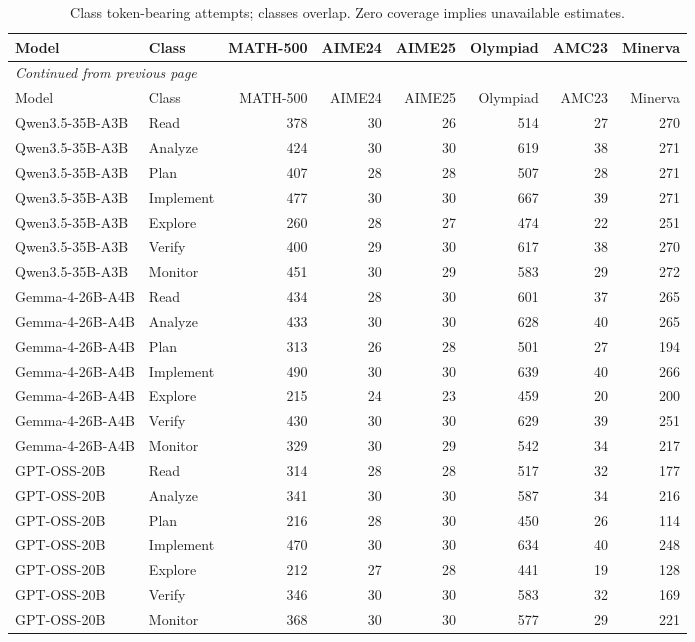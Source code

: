 \begingroup\scriptsize\setlength{\tabcolsep}{4pt}
\begin{longtable}{@{}llrrrrrr@{}}
\caption{Class token-bearing attempts; classes overlap. Zero coverage implies unavailable estimates.}\label{tab:multi-coverage}\\
\toprule
Model & Class & MATH-500 & AIME24 & AIME25 & Olympiad & AMC23 & Minerva \\
\midrule\endfirsthead
\multicolumn{8}{l}{\textit{Continued from previous page}}\\
\toprule
Model & Class & MATH-500 & AIME24 & AIME25 & Olympiad & AMC23 & Minerva \\
\midrule\endhead
\bottomrule\endfoot
Qwen3.5-35B-A3B & Read & 378 & 30 & 26 & 514 & 27 & 270 \\
Qwen3.5-35B-A3B & Analyze & 424 & 30 & 30 & 619 & 38 & 271 \\
Qwen3.5-35B-A3B & Plan & 407 & 28 & 28 & 507 & 28 & 271 \\
Qwen3.5-35B-A3B & Implement & 477 & 30 & 30 & 667 & 39 & 271 \\
Qwen3.5-35B-A3B & Explore & 260 & 28 & 27 & 474 & 22 & 251 \\
Qwen3.5-35B-A3B & Verify & 400 & 29 & 30 & 617 & 38 & 270 \\
Qwen3.5-35B-A3B & Monitor & 451 & 30 & 29 & 583 & 29 & 272 \\
Gemma-4-26B-A4B & Read & 434 & 28 & 30 & 601 & 37 & 265 \\
Gemma-4-26B-A4B & Analyze & 433 & 30 & 30 & 628 & 40 & 265 \\
Gemma-4-26B-A4B & Plan & 313 & 26 & 28 & 501 & 27 & 194 \\
Gemma-4-26B-A4B & Implement & 490 & 30 & 30 & 639 & 40 & 266 \\
Gemma-4-26B-A4B & Explore & 215 & 24 & 23 & 459 & 20 & 200 \\
Gemma-4-26B-A4B & Verify & 430 & 30 & 30 & 629 & 39 & 251 \\
Gemma-4-26B-A4B & Monitor & 329 & 30 & 29 & 542 & 34 & 217 \\
GPT-OSS-20B & Read & 314 & 28 & 28 & 517 & 32 & 177 \\
GPT-OSS-20B & Analyze & 341 & 30 & 30 & 587 & 34 & 216 \\
GPT-OSS-20B & Plan & 216 & 28 & 30 & 450 & 26 & 114 \\
GPT-OSS-20B & Implement & 470 & 30 & 30 & 634 & 40 & 248 \\
GPT-OSS-20B & Explore & 212 & 27 & 28 & 441 & 19 & 128 \\
GPT-OSS-20B & Verify & 346 & 30 & 30 & 583 & 32 & 169 \\
GPT-OSS-20B & Monitor & 368 & 30 & 30 & 577 & 29 & 221 \\
\end{longtable}\endgroup

